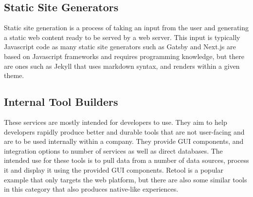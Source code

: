 \subsection{Static Site Generators}

Static site generation is a process of taking an input from the user and generating a static web content ready to be served by a web server. This input is typically Javascript code as many static site generators such as Gatsby \cite{Gatsby} and Next.js \cite{Nextjs} are based on Javascript frameworks and requires programming knowledge, but there are ones such as Jekyll \cite{Jekyll} that uses markdown syntax, and renders within a given theme.

\subsection{Internal Tool Builders}

These services are mostly intended for developers to use. They aim to help developers rapidly produce better and durable tools that are not user-facing and are to be used internally within a company. They provide GUI components, and integration options to number of services as well as direct databases. The intended use for these tools is to pull data from a number of data sources, process it and display it using the provided GUI components. Retool \cite{Retool} is a popular example that only targets the web platform, but there are also some similar tools in this category that also produces native-like experiences.
